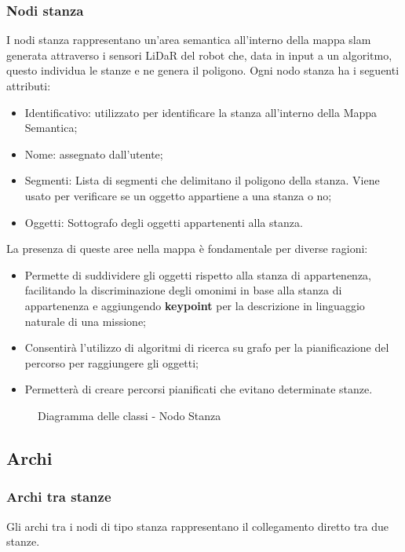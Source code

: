 \subsubsection{Nodi stanza}
I nodi stanza rappresentano un'area semantica all'interno della mappa slam generata attraverso i sensori LiDaR del robot che, data in input a un algoritmo, questo individua le stanze e ne genera il poligono.
Ogni nodo stanza ha i seguenti attributi:
\begin{itemize}
  \item Identificativo: utilizzato per identificare la stanza all'interno della Mappa Semantica;
  \item Nome: assegnato dall'utente;
  \item Segmenti: Lista di segmenti che delimitano il poligono della stanza. Viene usato per verificare se un oggetto appartiene a una stanza o no;
  \item Oggetti: Sottografo degli oggetti appartenenti alla stanza.
\end{itemize}
La presenza di queste aree nella mappa è fondamentale per diverse ragioni:
\begin{itemize}
  \item Permette di suddividere gli oggetti rispetto alla stanza di appartenenza, facilitando la discriminazione degli omonimi in base alla stanza di appartenenza e aggiungendo \textbf{keypoint} per la descrizione in linguaggio naturale di una missione;
  \item Consentirà l'utilizzo di algoritmi di ricerca su grafo per la pianificazione del percorso per raggiungere gli oggetti;
  \item Permetterà di creare percorsi pianificati che evitano determinate stanze.
\end{itemize}

\begin{figure}[h]
  \centering
  \caption{Diagramma delle classi - Nodo Stanza}
\end{figure}
\subsection{Archi}
\subsubsection{Archi tra stanze}
Gli archi tra i nodi di tipo stanza rappresentano il collegamento diretto tra due stanze.
